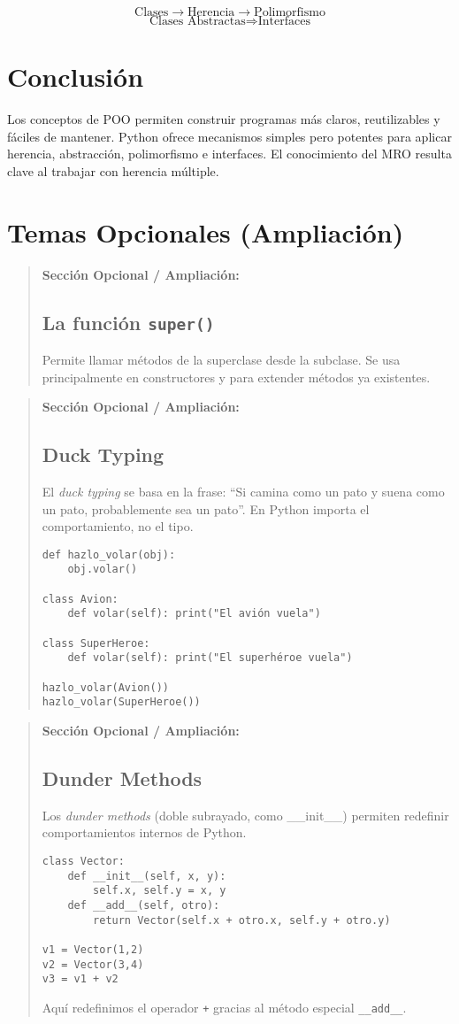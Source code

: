 \documentclass[a4paper,12pt]{article}
\newenvironment{opcional}{
  \par\color{purple}\begin{quote}\textbf{Sección Opcional / Ampliación:}\\
}{
  \end{quote}\par
}
\begin{document}
\[
\text{Clases} \rightarrow \text{Herencia} \rightarrow \text{Polimorfismo}
\]
\[
\text{Clases Abstractas} \Rightarrow \text{Interfaces}
\]

\section{Conclusión}
Los conceptos de POO permiten construir programas más claros, reutilizables y fáciles de mantener.  
Python ofrece mecanismos simples pero potentes para aplicar herencia, abstracción, polimorfismo e interfaces.  
El conocimiento del MRO resulta clave al trabajar con herencia múltiple.

\section*{Temas Opcionales (Ampliación)}

\begin{opcional}
\subsection*{La función \texttt{super()}}
Permite llamar métodos de la superclase desde la subclase. Se usa principalmente en constructores y para extender métodos ya existentes.
\end{opcional}

\begin{opcional}
\subsection*{Duck Typing}
El \textit{duck typing} se basa en la frase: ``Si camina como un pato y suena como un pato, probablemente sea un pato''.  
En Python importa el comportamiento, no el tipo.
\begin{lstlisting}
def hazlo_volar(obj):
    obj.volar()

class Avion:
    def volar(self): print("El avión vuela")

class SuperHeroe:
    def volar(self): print("El superhéroe vuela")

hazlo_volar(Avion())
hazlo_volar(SuperHeroe())
\end{lstlisting}
\end{opcional}

\begin{opcional}
\subsection*{Dunder Methods}
Los \textit{dunder methods} (doble subrayado, como \_\_init\_\_) permiten redefinir comportamientos internos de Python.
\begin{lstlisting}
class Vector:
    def __init__(self, x, y):
        self.x, self.y = x, y
    def __add__(self, otro):
        return Vector(self.x + otro.x, self.y + otro.y)

v1 = Vector(1,2)
v2 = Vector(3,4)
v3 = v1 + v2
\end{lstlisting}
Aquí redefinimos el operador \texttt{+} gracias al método especial \texttt{\_\_add\_\_}.
\end{opcional}
\end{document}
